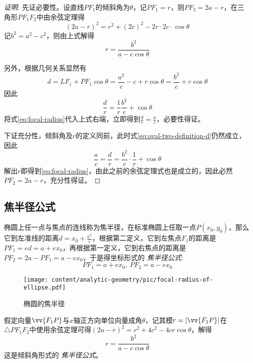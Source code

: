 \begin{proof}[证明]
 先证必要性。设直线$PF_1$的倾斜角为$\theta$，记$PF_1=r$，则$PF_2=2a-r$，在三角形$PF_1F_2$中由余弦定理得
\[ (2a-r)^2=r^2+(2c)^2-2r \cdot 2c \cdot \cos{\theta} \]
记$b^2=a^2-c^2$，则由上式解得
\begin{equation}
\label{eq:focal-radius}
r=\frac{b^2}{a-c\cos{\theta}}
\end{equation}

另外，根据几何关系显然有
\begin{equation}
  \label{eq:oval-two-definition-d}
 d=LF_1+PF_1\cos{\theta}=\frac{a^2}{c}-c+r\cos{\theta}=\frac{b^2}{c}+r\cos{\theta} 
\end{equation}
因此
\[ \frac{d}{r}=\frac{1}{r}\frac{b^2}{c}+\cos{\theta} \] 
将式\ref{eq:focal-radius}代入上式右端，立即得到$\frac{d}{r}=\frac{a}{c}$，必要性得证。

下证充分性，倾斜角及$r$的定义同前，此时式\ref{eq:oval-two-definition-d}仍然成立，因此
\[ \frac{a}{c}=\frac{d}{r}=\frac{b^2}{c} \cdot \frac{1}{r}+\cos{\theta} \]
解出$r$即得到\ref{eq:focal-radius}，由此之前的余弦定理式也是成立的，因此必然$PF_2=2a-r$，充分性得证。
\end{proof}


\subsection{焦半径公式}
\label{sec:oval-focal-radius}

椭圆上任一点与焦点的连线称为焦半径，在标准椭圆上任取一点$P(x_0,y_0)$，那么它到左准线的距离$d=x_0+\frac{a^2}{c}$，根据第二定义，它到左焦点$F_1$的距离是$PF_1=ed=a+ex_0$，再根据第一定义，它到右焦点的距离是$PF_2=2a-PF_1=a-ex_0$，于是得坐标形式的 \emph{焦半径公式}:
\begin{equation}
  \label{eq:oval-focal-radius-in-xy}
  PF_1=a+ex_0, \  PF_2=a-ex_0
\end{equation}

\begin{figure}[htbp]
  \centering
\texttt{[image: content/analytic-geometry/pic/focal-radius-of-ellipse.pdf]}
\caption{椭圆的焦半径}
\label{fig:focal-radius-of-ellipse}
\end{figure}

假定向量$\vv{F_1P}$与$x$轴正方向单位向量成角$\theta$，记其模$r=|\vv{F_1P}|$在$\triangle PF_1F_2$中使用余弦定理可得$(2a-r)^2=r^2+4c^2-4cr\cos{\theta}$，解得
\begin{equation}
  \label{eq:oval-focal-radius-theta}
  r=\frac{b^2}{a-c\cos{\theta}}
\end{equation}
这是倾斜角形式的 \emph{焦半径公式}。

